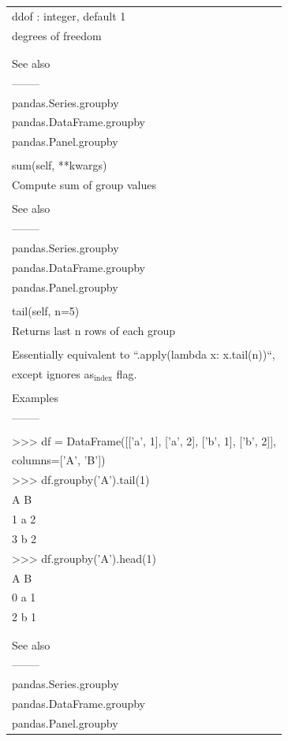 \documentclass[11pt]{article}
\begin{document}
\begin{enumerate}
\begin{enumerate}
\begin{enumerate}
\begin{center}
\begin{tabular}{l}
ddof : integer, default 1\\
degrees of freedom\\
\\
\\
See also\\
--------\\
pandas.Series.groupby\\
pandas.DataFrame.groupby\\
pandas.Panel.groupby\\
\\
sum(self, **kwargs)\\
Compute sum of group values\\
\\
See also\\
--------\\
pandas.Series.groupby\\
pandas.DataFrame.groupby\\
pandas.Panel.groupby\\
\\
tail(self, n=5)\\
Returns last n rows of each group\\
\\
Essentially equivalent to ``.apply(lambda x: x.tail(n))``,\\
except ignores as\(_{\text{index}}\) flag.\\
\\
Examples\\
--------\\
\\
>>> df = DataFrame([['a', 1], ['a', 2], ['b', 1], ['b', 2]],\\
columns=['A', 'B'])\\
>>> df.groupby('A').tail(1)\\
A  B\\
1  a  2\\
3  b  2\\
>>> df.groupby('A').head(1)\\
A  B\\
0  a  1\\
2  b  1\\
\\
\\
See also\\
--------\\
pandas.Series.groupby\\
pandas.DataFrame.groupby\\
pandas.Panel.groupby\\

\end{tabular}
\end{center}
\end{enumerate}
\end{enumerate}
\end{enumerate}
\end{document}
